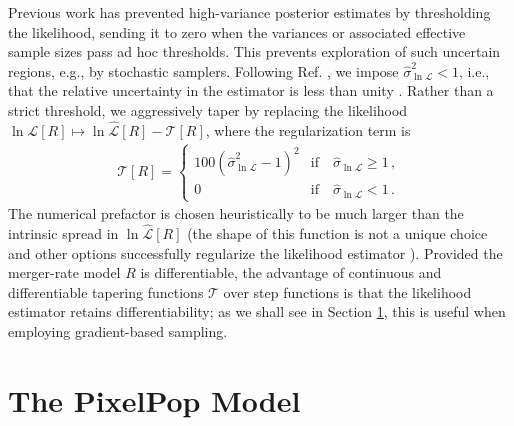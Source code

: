 \begin{refsection}
Previous work has prevented high-variance posterior estimates by thresholding the likelihood, sending it to zero when the variances \cite{Talbot:2023pex} or associated effective sample sizes \cite{Farr:2019rap, KAGRA:2021duu} pass ad hoc thresholds. This prevents exploration of such uncertain regions, e.g., by stochastic samplers. Following Ref. \cite{Talbot:2023pex}, we impose $\hat{\sigma}_{\ln\mathcal{L}}^2 < 1$, i.e., that the relative uncertainty in the estimator is less than unity \cite{Essick:2022ojx}. Rather than a strict threshold, we aggressively taper by replacing the likelihood $\ln\mathcal{L}[R] \mapsto \ln\hat{\mathcal{L}}[R] - \mathcal{T}[R]$, where the regularization term is
\begin{align}
\mathcal{T}[R]
=
\begin{cases}
100 ( \hat{\sigma}_{\ln\mathcal{L}}^2 - 1 )^2
& \mathrm{if} \quad \hat{\sigma}_{\ln\mathcal{L}} \geq 1
\, ,
\\
0
& \mathrm{if} \quad \hat{\sigma}_{\ln\mathcal{L}} < 1
\, .
\end{cases}
\label{eq: likelihood taper}
\end{align}
The numerical prefactor is chosen heuristically to be much larger than the intrinsic spread in $\ln\hat{\mathcal{L}}[R]$ (the shape of this function is not a unique choice and other options successfully regularize the likelihood estimator \cite{Callister:2023tgi}). Provided the merger-rate model $R$ is differentiable, the advantage of continuous and differentiable tapering functions $\mathcal{T}$ over step functions is that the likelihood estimator retains differentiability; as we shall see in Section \ref{sec: ppmethods car model}, this is useful when employing gradient-based sampling.

\section{The PixelPop Model}
\label{sec: ppmethods car model}


\end{refsection}
